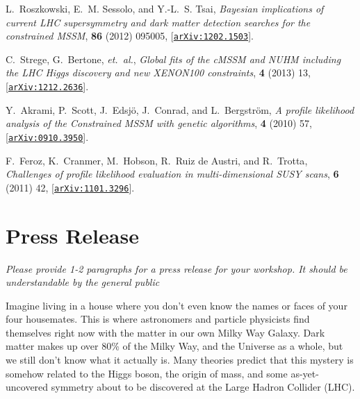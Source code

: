 \documentclass[a4paper,11pt]{article}
\newenvironment{xcomment}{\em}{}
\begin{document}
\begin{thebibliography}{10}
L.~{Roszkowski}, E.~M. {Sessolo}, and Y.-L.~S. {Tsai}, {\it {Bayesian
  implications of current LHC supersymmetry and dark matter detection searches
  for the constrained MSSM}},  {\em \prd} {\bf 86} (2012) 095005,
  [\href{http://xxx.lanl.gov/abs/{arXiv:1202.1503}}{{\tt {arXiv:1202.1503}}}].

C.~{Strege}, G.~{Bertone}, {\em et.~al.}, {\it {Global fits of the cMSSM and
  NUHM including the LHC Higgs discovery and new XENON100 constraints}},  {\em
  \jcap} {\bf 4} (2013) 13,
  [\href{http://xxx.lanl.gov/abs/{arXiv:1212.2636}}{{\tt {arXiv:1212.2636}}}].

Y.~{Akrami}, P.~{Scott}, J.~Edsj{\"o}, J.~{Conrad}, and L.~{Bergstr{\"o}m},
  {\it {A profile likelihood analysis of the Constrained MSSM with genetic
  algorithms}},  {\em \jhep} {\bf 4} (2010) 57,
  [\href{http://xxx.lanl.gov/abs/0910.3950}{{\tt arXiv:0910.3950}}].

F.~{Feroz}, K.~{Cranmer}, M.~{Hobson}, R.~{Ruiz de Austri}, and R.~{Trotta},
  {\it {Challenges of profile likelihood evaluation in multi-dimensional SUSY
  scans}},  {\em \jhep} {\bf 6} (2011) 42,
  [\href{http://xxx.lanl.gov/abs/1101.3296}{{\tt arXiv:1101.3296}}].

\end{thebibliography}\endgroup

\section{Press Release}
\begin{xcomment}
Please provide 1-2 paragraphs for a press release for your workshop. It should be understandable by the general public
\end{xcomment}

Imagine living in a house where you don't even know the names or faces of your four housemates. This is where astronomers and particle physicists find themselves right now with the matter in our own Milky Way Galaxy. Dark matter makes up over 80\% of the Milky Way, and the Universe as a whole, but we still don't know what it actually is.  Many theories predict that this mystery is somehow related to the Higgs boson, the origin of mass, and some as-yet-uncovered symmetry about to be discovered at the Large Hadron Collider (LHC).
\end{document}
